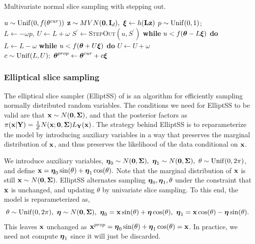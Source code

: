 \begin{algorithm}[htbp]
	\caption{Multivariate normal slice sampling with stepping out.}\label{alg:mvnss}
	\begin{algorithmic}[1]
		\State $ u \sim \mathrm{Unif}(0,f(\theta^{cur})) $
		\State $\mathbf{z}\sim MVN(\mathbf{0},\mathbf{I}_d),\ \boldsymbol{\xi}\gets h(\mathbf{L}\mathbf{z})$ 
		\State $ p\sim \mathrm{Unif}(0,1) $; $ L \gets - \omega p,\ U \gets L+\omega $ 
		\State $ S^\prime \gets $\textsc{StepOut}$ (u,S^\prime) $ 
		\State\hspace{\algorithmicindent}\textbf{while }{$ u<f(\boldsymbol{\theta} - L\boldsymbol{\xi}) $} \textbf{do} $ L \gets L-\omega $
		\State\hspace{\algorithmicindent}\textbf{while }{$u<f(\boldsymbol{\theta} + U\boldsymbol{\xi})$} \textbf{do} $ U \gets U+\omega $
		\State $ c \sim \mathrm{Unif}(L,U);\  \boldsymbol{\theta}^{prop}\gets \boldsymbol{\theta}^{cur} + c\boldsymbol{\xi} $ 
		\State\Return{$ \new{\btheta} $}
		\Else{}
		\EndIf 	
		\EndIf
		\EndProcedure
	\end{algorithmic}
\end{algorithm}

\subsubsection{Elliptical slice sampling}
\label{subsubsec:elliptical_slice_sampling}

The elliptical slice sampler (ElliptSS) of \cite{murray2010} is an algorithm for efficiently sampling normally distributed random variables. The conditions we need for ElliptSS to be valid are that $ \mathbf{x}\sim N(\mathbf{0}, \boldsymbol{\Sigma}) $, and that the posterior factors as $ \pi(\mathbf{x}|\mathbf{Y})= \frac{1}{Z}N(\mathbf{x};\boldsymbol{0}, \boldsymbol{\Sigma})L_{\mathbf{Y}}(\mathbf{x}) $. The strategy behind ElliptSS is to reparameterize the model by introducing auxiliary variables in a way that preserves the marginal distribution of $ \mathbf{x} $, and thus preserves the likelihood of the data conditional on $ \mathbf{x} $.

We introduce auxiliary variables, $
\boldsymbol{\eta}_0 \sim N(\boldsymbol{0}, \boldsymbol{\Sigma}),\
\boldsymbol{\eta}_1 \sim N(\boldsymbol{0}, \boldsymbol{\Sigma}),\
\theta \sim \mathrm{Unif}(0, 2\pi)$, and define $
\mathbf{x} = \boldsymbol{\eta}_0\sin(\theta) + \boldsymbol{\eta}_1\cos(\theta). $ Note that the marginal distribution of $ \mathbf{x} $ is still $ \mathbf{x}\sim N(\boldsymbol{0}, \boldsymbol{\Sigma}) $. ElliptSS alternates sampling $ \boldsymbol{\eta}_0,\boldsymbol{\eta}_1,\theta $ under the constraint that $ \mathbf{x} $ is unchanged, and updating $ \theta $ by univariate slice sampling. To this end, the model is reparameterized as, $$\theta \sim \mathrm{Unif}(0, 2\pi),\
\boldsymbol{\eta} \sim N(\boldsymbol{0}, \boldsymbol{\Sigma}),\
\boldsymbol{\eta}_0 = \mathbf{x} \sin(\theta) + \boldsymbol{\eta} \cos(\theta),\
\boldsymbol{\eta}_1 = \mathbf{x}\cos(\theta) - \boldsymbol{\eta}\sin(\theta).$$ This leaves $ \mathbf{x} $ unchanged as $ \mathbf{x}^{prop} = \boldsymbol{\eta}_0\sin(\theta) + \boldsymbol{\eta}_1\cos(\theta) = \mathbf{x}$. In practice, we need not compute $ \boldsymbol{\eta}_1 $ since it will just be discarded.

